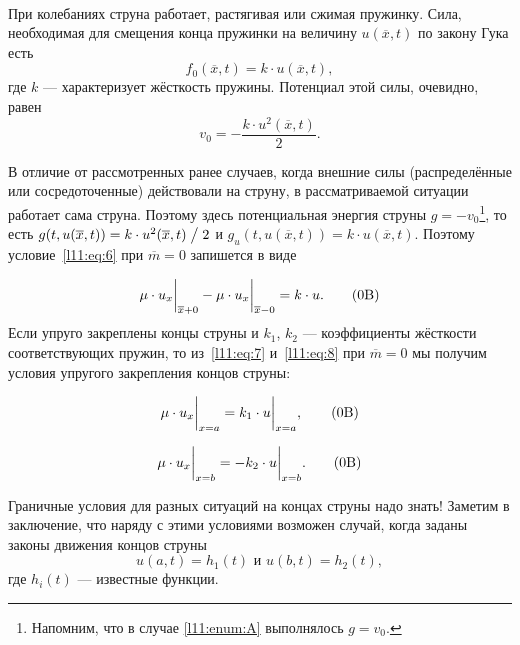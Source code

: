 \begin{enumerateA}
\begin{figure}[H]
\begin{tikzpicture}[x=0.75pt,y=0.75pt,yscale=-1,xscale=1]
		
	\end{tikzpicture}
	\caption{~}
	\label{l11:fig:5}
\end{figure}
	При колебаниях струна работает, растягивая или сжимая пружинку. Сила, необходимая для смещения конца пружинки на величину $u(\overline{x},t)$ по закону Гука есть
	\begin{equation*}
		f_0(\overline{x},t)=k\cdot u(\overline{x},t),  
	\end{equation*}
	где $k$ --- характеризует жёсткость пружины. Потенциал этой силы, очевидно, равен 
	\begin{equation*}
		v_0=-\frac{k\cdot u^2(\overline{x},t)}{2}.
	\end{equation*}
	
	В отличие от рассмотренных ранее случаев, когда внешние силы (распределённые или сосредоточенные) действовали на струну, в рассматриваемой ситуации работает сама струна. Поэтому здесь потенциальная энергия струны $g=-v_0$\footnote{Напомним, что в случае \ref{l11:enum:A} выполнялось $g=v_0$.}, то есть $g(t,u(\overline{x},t))\?=k\cdot u^2(\overline{x},t)\bigm/2$ и $g_u(t,u(\overline{x},t))=k\cdot u(\overline{x},t)$. Поэтому условие~\eqref{l11:eq:6} при $\overline{m}=0$ запишется в виде\addtocounter{equation}{-3}%
	\begin{equation}
		\label{l11:eq:6B}
		\mu\cdot u_x\bigg|_{\overline{x}+0}-\mu\cdot u_x\bigg|_{\overline{x}-0}=k\cdot u. \tag{\theequation{}B}
	\end{equation}  
	Если упруго закреплены концы струны и $k_1$, $k_2$ --- коэффициенты жёсткости соответствующих пружин, то из~\eqref{l11:eq:7} и~\eqref{l11:eq:8} при $\overline{m}=0$ мы получим условия упругого закрепления концов струны:%
	\addtocounter{equation}{1}%
	\begin{equation}
		\label{l11:eq:7B}
		\mu\cdot u_x\bigg|_{x=a}=k_1\cdot u\bigg|_{x=a},\tag{\theequation{}B}
	\end{equation}\addtocounter{equation}{1}%
	\begin{equation}
		\label{l11:eq:8B}
		\mu\cdot u_x\bigg|_{x=b}=-k_2\cdot u\bigg|_{x=b}.\tag{\theequation{}B}
	\end{equation}
	\addtocounter{equation}{1} 
	
	Граничные условия для разных ситуаций на концах струны надо знать! Заметим в заключение, что наряду с этими условиями возможен случай, когда заданы законы движения концов струны
	\begin{equation*}
		 u(a,t)=h_1(t)\text{ и }u(b,t)=h_2(t),
	\end{equation*} 
	где $h_i(t)$ --- известные функции.
\end{enumerateA}